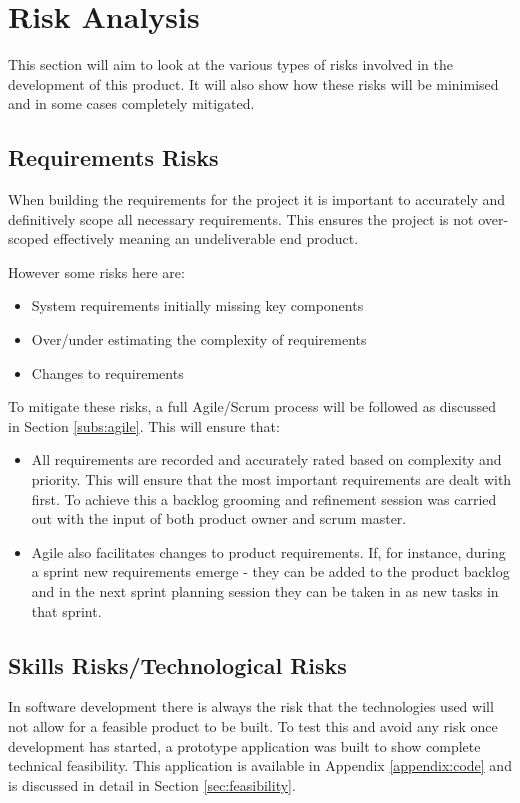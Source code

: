 \section{Risk Analysis}
This section will aim to look at the various types of risks involved in the development of this product. It will also show how these risks will be minimised and in some cases completely mitigated.

\subsection{Requirements Risks}
When building the requirements for the project it is important to accurately and definitively scope all necessary requirements. This ensures the project is not over-scoped effectively meaning an undeliverable end product.

However some risks here are:

\begin{itemize}
	\item System requirements initially missing key components
	\item Over/under estimating the complexity of requirements
	\item Changes to requirements
\end{itemize}

To mitigate these risks, a full Agile/Scrum process will be followed as discussed in Section \ref{subs:agile}. This will ensure that:

\begin{itemize}
	\item All requirements are recorded and accurately rated based on complexity and priority. This will ensure that the most important requirements are dealt with first. To achieve this a backlog grooming and refinement session was carried out with the input of both product owner and scrum master.
	\item Agile also facilitates changes to product requirements. If, for instance, during a sprint new requirements emerge - they can be added to the product backlog and in the next sprint planning session they can be taken in as new tasks in that sprint. 
\end{itemize}

\subsection{Skills Risks/Technological Risks}
In software development there is always the risk that the technologies used will not allow for a feasible product to be built. To test this and avoid any risk once development has started, a prototype application was built to show complete technical feasibility. This application is available in Appendix \ref{appendix:code} and is discussed in detail in Section \ref{sec:feasibility}.

